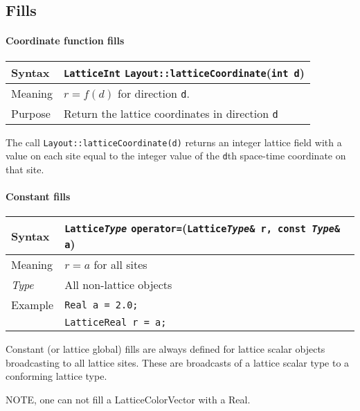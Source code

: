 \documentclass[12pt,letterpaper]{article}
\newcommand{\tLatticeReal}{LatticeReal}
\newcommand{\tLatticeInt}{LatticeInt}
\newcommand{\tReal}{Real}
\newcommand{\tLatticeColorVector}{LatticeColorVector}
\newcommand{\itt}{\it Type}
\begin{document}
\subsection{Fills}

\paragraph{Coordinate function fills}

\begin{flushleft}
  \begin{tabular}{|l|l|}
  \hline
  Syntax      & {\tt \tLatticeInt} \verb|Layout::latticeCoordinate|({\tt int d})\\
  \hline
  Meaning     & $r = f(d)$ for direction \verb|d|.\\
  \hline
  Purpose     & Return the lattice coordinates in direction \verb|d|\\
  \hline
  \end{tabular}
\end{flushleft}
%
The call \verb|Layout::latticeCoordinate(d)| returns an integer lattice field with a
value on each site equal to the integer value of the \verb|d|th
space-time coordinate on that site.

\paragraph{Constant fills}

\begin{flushleft}
  \begin{tabular}{|l|l|}
  \hline
  Syntax      & {\tt Lattice{\it Type}} \verb|operator=|({\tt Lattice{\it Type}\& r, const {\it Type}\& a})\\
  \hline
  Meaning     & $r = a$ for all sites\\
  \hline
  \itt        & All non-lattice objects \\
  \hline
  Example     & {\tt \tReal{} a = 2.0;}\\
              & {\tt \tLatticeReal{} r = a;}\\
  \hline
  \end{tabular}
\end{flushleft}

Constant (or lattice global) fills are always defined for lattice scalar objects broadcasting to
all lattice sites. These are broadcasts of a lattice scalar type to a conforming lattice type.

NOTE, one can not fill a \tLatticeColorVector{} with a \tReal.
\end{document}
